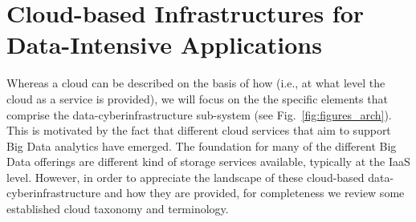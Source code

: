 \documentclass[times]{cpeauth}
\newcommand{\jhanote}[1]{ {\textcolor{red} { ***shantenu: #1 }}}
\newcommand{\alnote}[1]{ {\textcolor{green} { ***andreL: #1 }}}
\newcommand{\alnote}[1]{}
\newcommand{\jhanote}[1]{}
\begin{document}

\section{Cloud-based Infrastructures for Data-Intensive Applications}


Whereas a cloud can be described on the basis of how (i.e., at what
level the cloud as a service is provided), we will focus on the the
specific elements that comprise the data-cyberinfrastructure
sub-system (see Fig.~\ref{fig:figures_arch}).  This is motivated by
the fact that different cloud services that aim to support Big Data
analytics have emerged.  The foundation for many of the different Big
Data offerings are different kind of storage services available,
typically at the IaaS level.  However, in order to appreciate the
landscape of these cloud-based data-cyberinfrastructure and how they
are provided, for completeness we review some established cloud
taxonomy and terminology.
\end{document}
